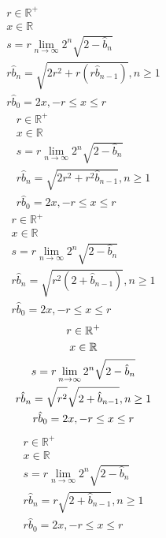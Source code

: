 \documentclass[a4paper,12pt]{report}
\begin{document}
\begin{subequations}
\begin{gather}
r \in \mathbb{R}^+ \\
x \in \mathbb{R} \\
s = r \lim \limits_{n \to \infty} 2^n \sqrt{2 - \hat{b}_n} \\
r \hat{b}_n = \sqrt{2r^2 + r (r \hat{b}_{n-1})}, n \geq 1 \\
r \hat{b}_0 = 2x, -r \leq x \leq r
\end{gather}
\end{subequations}
\begin{subequations}
\begin{gather}
r \in \mathbb{R}^+ \\
x \in \mathbb{R} \\
s = r \lim \limits_{n \to \infty} 2^n \sqrt{2 - \hat{b}_n} \\
r \hat{b}_n = \sqrt{2r^2 + r^2 \hat{b}_{n-1}}, n \geq 1 \\
r \hat{b}_0 = 2x, -r \leq x \leq r
\end{gather}
\end{subequations}
\begin{subequations}
\begin{gather}
r \in \mathbb{R}^+ \\
x \in \mathbb{R} \\
s = r \lim \limits_{n \to \infty} 2^n \sqrt{2 - \hat{b}_n} \\
r \hat{b}_n = \sqrt{r^2 (2 + \hat{b}_{n-1})}, n \geq 1 \\
r \hat{b}_0 = 2x, -r \leq x \leq r
\end{gather}
\end{subequations}
\begin{subequations}
\begin{gather}
r \in \mathbb{R}^+ \\
x \in \mathbb{R} \\
s = r \lim \limits_{n \to \infty} 2^n \sqrt{2 - \hat{b}_n} \\
r \hat{b}_n = \sqrt{\vphantom{2 + \hat{b}_{n-1}} r^2} \sqrt{2 + \hat{b}_{n-1}}, n \geq 1 \\
r \hat{b}_0 = 2x, -r \leq x \leq r
\end{gather}
\end{subequations}
\begin{subequations}
\begin{gather}
r \in \mathbb{R}^+ \\
x \in \mathbb{R} \\
s = r \lim \limits_{n \to \infty} 2^n \sqrt{2 - \hat{b}_n} \\
r \hat{b}_n = r \sqrt{2 + \hat{b}_{n-1}}, n \geq 1 \\
r \hat{b}_0 = 2x, -r \leq x \leq r
\end{gather}
\end{subequations}
\end{document}
